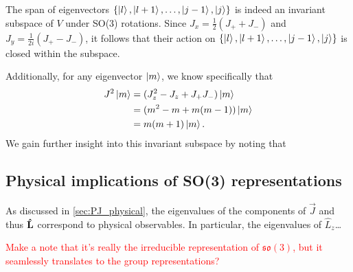     The span of eigenvectors $\left\{ \ket{l}, \ket{l+1}, \dots, \ket{j-1}, \ket{j} \right\}$ is indeed an invariant subspace of $V$ under SO(3) rotations. Since $J_x = \frac{1}{2}(J_+ + J_-)$ and $J_y = \frac{1}{2i}(J_+ - J_-)$, it follows that their action on $\left\{ \ket{l}, \ket{l+1}, \dots, \ket{j-1}, \ket{j} \right\}$ is closed within the subspace.

    Additionally, for any eigenvector $\ket{m}$, we know specifically that
    \begin{align*}
        J^2\ket{m} &= (J_z^2 - J_z + J_+ J_-)\ket{m} \\
        &= (m^2 - m + m(m-1))\ket{m} \\
        &= m(m+1)\ket{m}.
    \end{align*}
    We gain further insight into this invariant subspace by noting that

    \subsection{Physical implications of SO(3) representations}
    As discussed in \cref{sec:PJ_physical}, the eigenvalues of the components of $\vec{J}$ and thus $\mathbf{\hat{L}}$ correspond to physical observables. In particular, the eigenvalues of $\hat{L}_z$\dots

    \textcolor{red}{Make a note that it's really the irreducible representation of $\mathfrak{so}(3)$, but it seamlessly translates to the group representations?}

    
    


    
